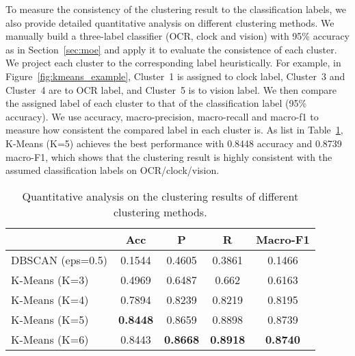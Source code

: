 To measure the consistency of the clustering result to the classification labels, we also provide detailed quantitative analysis on different clustering methods. We manually build a three-label classifier (OCR, clock and vision) with 95\% accuracy as in Section~\ref{sec:moe} and apply it to evaluate the consistence of each cluster. We project each cluster to the corresponding label heuristically. For example, in Figure~\ref{fig:kmeans_example}, Cluster~1 is assigned to clock label, Cluster~3 and Cluster~4 are to OCR label, and Cluster~5 is to vision label. We then compare the assigned label of each cluster to that of the classification label (95\% accuracy). We use accuracy, macro-precision, macro-recall and macro-f1 to measure how consistent the compared label in each cluster is. As list in Table~\ref{tab:cluster}, K-Means (K=5) achieves the best performance with 0.8448 accuracy and 0.8739 macro-F1, which shows that the clustering result is highly consistent with the assumed classification labels on OCR/clock/vision. 




\begin{table}[h]
\centering
\caption{Quantitative analysis on the clustering results of different clustering methods.}\label{tab:cluster}
\begin{tabular}{l|c|ccc}
\toprule
                  & Acc    & P      & R      & Macro-F1 \\ 
\midrule
DBSCAN (eps=0.5)  & 0.1544 & 0.4605 & 0.3861 & 0.1466   \\
K-Means (K=3)       & 0.4969 & 0.6487 & 0.662  & 0.6163   \\ 
K-Means (K=4)       & 0.7894 & 0.8239 & 0.8219 & 0.8195   \\ 
K-Means (K=5)       & \textbf{0.8448} & 0.8659 & 0.8898 & 0.8739   \\ 
K-Means (K=6)       & 0.8443 & \textbf{0.8668} & \textbf{0.8918} & \textbf{0.8740}   \\ 
\bottomrule
\end{tabular}
\end{table}

